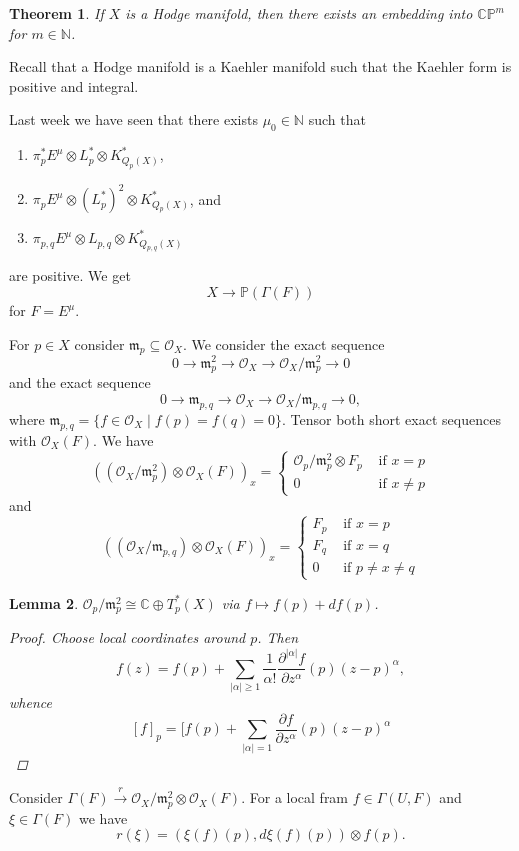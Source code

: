 \documentclass[12pt]{article}
\theoremstyle{darkgreentheorem}
\newtheorem{thm}{Theorem}[section]
\newtheorem{lm}[thm]{Lemma}
\theoremstyle{darkbluedefinition}
\theoremstyle{darkredexample}
\theoremstyle{remark}
\newcommand{\N}{\mathbb{N}}
\newcommand{\1}{\mathbbm{1}}
\newcommand{\C}{\mathbb{C}}
\renewcommand{\P}{\mathbb{P}}
\newcommand{\CP}{\mathbb{CP}}
\renewcommand{\O}{\mathcal{O}}
\newcommand{\m}{\mathfrak{m}}
\newcommand{\ot}{\otimes}
\newcommand{\op}{\oplus}
\newcommand{\sub}{\subseteq}
\begin{document}
\begin{thm}
    If $X$ is a Hodge manifold, then there exists an embedding into $\CP^{m}$ for $m\in \N$.
\end{thm}

Recall that a Hodge manifold is a Kaehler manifold such that the Kaehler form is positive and integral.

Last week we have seen that there exists $\mu_{0}\in \N$ such that
\begin{enumerate}[label=\roman*)]
    \item $\pi_{p}^{*}E^{\mu}\ot L_{p}^{*}\ot K_{Q_{p}(X)}^{*}$,
    \item $\pi_{p}E^{\mu}\ot (L_{p}^{*})^{2}\ot K_{Q_{p}(X)}^{*}$, and
    \item $\pi_{p,q}E^{\mu}\ot L_{p,q}\ot K_{Q_{p,q}(X)}^{*}$
\end{enumerate}
are positive.
We get
\[ X\longrightarrow \P(\Gamma(F))\]
for $F=E^{\mu}$.

For $p\in X$ consider $\m_{p}\sub \O_{X}$.
We consider the exact sequence
\[ 0\to \m_{p}^{2}\to \O_{X}\to \O_{X}/\m_{p}^{2}\to 0\]
and the exact sequence
\[ 0\to \m_{p,q}\to \O_{X}\to \O_{X}/\m_{p,q} \to 0, \]
where $\m_{p,q}=\{f\in \O_{X}\mid f(p)=f(q)=0 \}$.
Tensor both short exact sequences with $\O_{X}(F)$.
We have
\[ ((\O_{X}/\m_{p}^{2})\ot \O_{X}(F))_{x}=\begin{cases} \O_{p}/\m_{p}^{2}\ot F_{p} &\text{ if }x=p \\
    0 &\text{ if }x\neq p
\end{cases}\]
and
\[ ((\O_{X}/\m_{p,q})\ot \O_{X}(F))_{x}=\begin{cases} F_{p} &\text{ if } x=p \\
    F_{q} &\text{ if }x=q \\
    0 &\text{ if }p\neq x\neq q
\end{cases} \]

\begin{lm}
    $\O_{p}/\m_{p}^{2}\cong \C\op T_{p}^{*}(X)$ via $f\mapsto f(p)+df(p)$.
    \begin{proof}
	Choose local coordinates around $p$.
	Then
	\[ f(z)=f(p)+\sum_{|\alpha|\geqslant 1}\frac{1}{\alpha !}\frac{\partial^{|\alpha|} f}{\partial z^{\alpha}}(p)(z-p)^{\alpha}, \]
	whence
	\[ [f]_{p}=[f(p)+\sum_{|\alpha|=1}\frac{\partial f}{\partial z^{\alpha}}(p)(z-p)^{\alpha} \]
    \end{proof}
\end{lm}

Consider $\Gamma(F)\xrightarrow{r} \O_{X}/\m_{p}^{2}\ot \O_{X}(F) $.
For a local fram $f\in \Gamma(U,F)$ and $\xi\in \Gamma(F)$ we have
\[ r(\xi)=(\xi(f)(p),d\xi(f)(p))\ot f(p). \]
\end{document}
